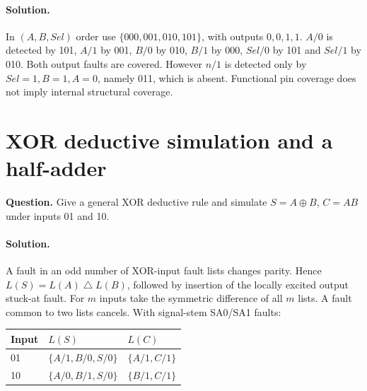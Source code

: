 \documentclass[11pt]{article}
\newcommand{\sol}{\paragraph{Solution.}}
\begin{document}
\sol In $(A,B,Sel)$ order use $\{000,001,010,101\}$, with outputs $0,0,1,1$.
$A/0$ is detected by 101, $A/1$ by 001, $B/0$ by 010, $B/1$ by 000,
$Sel/0$ by 101 and $Sel/1$ by 010. Both output faults are covered.
However $n/1$ is detected only by $Sel=1,B=1,A=0$, namely 011, which is absent.
Functional pin coverage does not imply internal structural coverage.

\section{XOR deductive simulation and a half-adder}
\textbf{Question.} Give a general XOR deductive rule and simulate
$S=A\oplus B$, $C=AB$ under inputs 01 and 10.
\sol A fault in an odd number of XOR-input fault lists changes parity.
Hence $L(S)=L(A)\mathbin{\triangle}L(B)$, followed by insertion of the
locally excited output stuck-at fault. For $m$ inputs take the symmetric
difference of all $m$ lists. A fault common to two lists cancels.
With signal-stem SA0/SA1 faults:
\begin{center}\begin{tabular}{lll}\toprule Input & $L(S)$ & $L(C)$\\\midrule
01 & $\{A/1,B/0,S/0\}$ & $\{A/1,C/1\}$\\
10 & $\{A/0,B/1,S/0\}$ & $\{B/1,C/1\}$\\\bottomrule
\end{tabular}\end{center}
\begin{center}\end{center}
\end{document}
